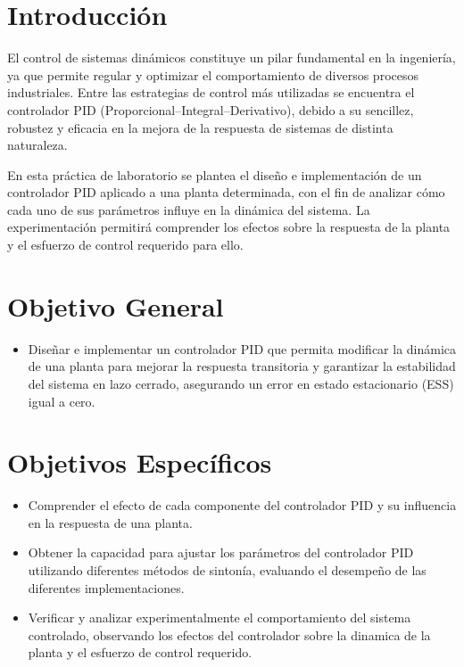 \section{Introducción}
El control de sistemas dinámicos constituye un pilar fundamental en la ingeniería, ya que permite regular y optimizar el comportamiento de diversos procesos industriales. Entre las estrategias de control más utilizadas se encuentra el controlador PID (Proporcional–Integral–Derivativo), debido a su sencillez, robustez y eficacia en la mejora de la respuesta de sistemas de distinta naturaleza.  

En esta práctica de laboratorio se plantea el diseño e implementación de un controlador PID aplicado a una planta determinada, con el fin de analizar cómo cada uno de sus parámetros influye en la dinámica del sistema. La experimentación permitirá comprender los efectos sobre la respuesta de la planta y el esfuerzo de control requerido para ello.

\section{Objetivo General}
\begin{itemize}
	\item Diseñar e implementar un controlador PID que permita modificar la dinámica de una planta
	para mejorar la respuesta transitoria y garantizar la estabilidad del sistema en lazo cerrado,
	asegurando un error en estado estacionario (ESS) igual a cero.
\end{itemize}

	
\section{Objetivos Específicos}
\begin{itemize}
	\item Comprender el efecto de cada componente del controlador PID y su influencia en la respuesta de una planta. %
	\item Obtener la capacidad para ajustar los parámetros del controlador PID utilizando diferentes métodos de sintonía, evaluando el desempeño de las diferentes implementaciones.
	\item Verificar y analizar experimentalmente el comportamiento del sistema controlado, observando
	los efectos del controlador sobre la dinamica de la planta y el esfuerzo de control requerido.
\end{itemize}